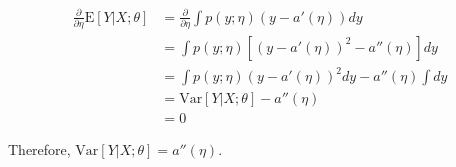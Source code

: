 \begin{answer}
	$$
	\begin{aligned}
		\frac{\partial}{\partial\eta} \mathrm E[Y | X; \theta] & = \frac{\partial}{\partial\eta} \int p(y; \eta) (y - a'(\eta)) dy\\
		& = \int p(y; \eta)[(y - a'(\eta))^2 - a''(\eta)] dy\\
		& = \int p(y; \eta)(y - a'(\eta))^2 dy - a''(\eta)\int dy\\
		& = \mathrm{Var}[Y | X; \theta] - a''(\eta)\\
		& = 0
	\end{aligned}
	$$
	
	Therefore, $\mathrm{Var}[Y | X; \theta] = a''(\eta)$.
\end{answer}